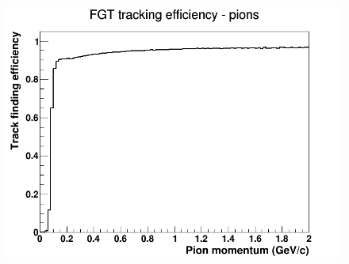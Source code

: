 \begin{figure}[h]
\endminipage
{}
\includegraphics[width=\linewidth]{eff_plots/fgt_trkeff_pion.png}
\endminipage
\end{figure}
\clearpage

